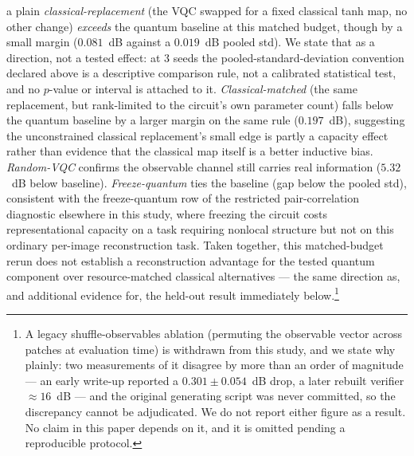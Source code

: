 \documentclass[11pt]{article}
\DeclareRobustCommand{\blue}[1]{\leavevmode{\color{blue}#1}}
\begin{document}
\blue{In this rerun,} a plain \emph{classical-replacement} (the VQC swapped for a fixed classical tanh map, no other change) \emph{exceeds} the quantum baseline at this matched budget, though by a small margin ($0.081$~dB against a $0.019$~dB pooled std). We state that as a direction, not a tested effect: at 3 seeds the pooled-standard-deviation convention declared above is a descriptive comparison rule, not a calibrated statistical test, and no $p$-value or interval is attached to it. \emph{Classical-matched} (the same replacement, but rank-limited to the circuit's own parameter count) falls below the quantum baseline by a larger margin on the same rule ($0.197$~dB), suggesting the unconstrained classical replacement's small edge is partly a capacity effect rather than evidence that the classical map itself is a better inductive bias. \emph{Random-VQC} confirms the observable channel still carries real information ($5.32$~dB below baseline). \emph{Freeze-quantum} ties the baseline (gap below the pooled std), consistent with the freeze-quantum row of the restricted pair-correlation diagnostic elsewhere in this study, where freezing the circuit costs representational capacity on a task requiring nonlocal structure but not on this ordinary per-image reconstruction task. Taken together, this matched-budget rerun does not establish a reconstruction advantage for the tested quantum component over resource-matched classical alternatives --- the same direction as, and additional evidence for, the held-out result immediately below.\footnote{A legacy shuffle-observables ablation (permuting the observable vector across patches at evaluation time) is withdrawn from this study, and we state why plainly: two measurements of it disagree by more than an order of magnitude --- an early write-up reported a $0.301\pm0.054$~dB drop, a later rebuilt verifier $\approx16$~dB --- and the original generating script was never committed, so the discrepancy cannot be adjudicated. We do not report either figure as a result. No claim in this paper depends on it, and it is omitted pending a reproducible protocol.}
\end{document}
